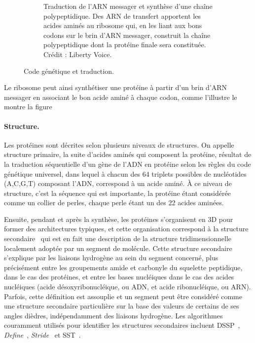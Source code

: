 \begin{figure}[htb]
\begin{subfigure}[t]{0.55\textwidth}
			\caption[Traduction de l'ARN messager en protéine]{Traduction de l'ARN messager et synthèse d'une chaîne polypeptidique. Des ARN de transfert apportent les acides aminés au ribosome qui, en les liant aux bons codons sur le brin d'ARN messager, construit la chaîne polypeptidique dont la protéine finale sera constituée. Crédit : Liberty Voice\footnotemark{}.}
			\label{fig:translation}
		\end{subfigure}
		\label{fig:codeTrans}
		\caption{Code génétique et traduction.}
	\end{figure}
	
	\addtocounter{footnote}{-1}
	\addtocounter{footnote}{1}
	
	Le ribosome peut ainsi synthétiser une protéine à partir d'un brin d'ARN messager en associant le bon acide aminé à chaque codon, comme l'illustre le montre la figure
	
	\paragraph{Structure.}
	Les protéines sont décrites selon plusieurs niveaux de structures. On appelle structure primaire, la suite d'acides aminés qui composent la protéine, résultat de la traduction séquentielle d'un gène de l'ADN en protéine selon les règles du code génétique universel, dans lequel à chacun des 64 triplets possibles de nucléotides (A,C,G,T) composant l'ADN, correspond à un acide aminé. À ce niveau de structure, c'est la séquence qui est importante, la protéine étant considérée comme un collier de perles, chaque perle étant un des 22 acides aminées.
	
	Ensuite, pendant et après la synthèse, les protéines s'organisent en 3D pour former des architectures typiques, et cette organisation correspond à la structure secondaire~\cite{foltmann1981protein} qui est en fait une description de la structure tridimensionnelle localement adoptée par un segment de molécule. Cette structure secondaire s'explique par les liaisons hydrogène au sein du segment concerné, plus précisément entre les groupements amide et carbonyle du squelette peptidique, dans le cas des protéines, et entre les bases nucléiques dans le cas des acides nucléiques (acide désoxyribonucléique, ou ADN, et acide ribonucléique, ou ARN). Parfois, cette définition est assouplie et un segment peut être considéré comme une structure secondaire particulière sur la base des valeurs de certains de ses angles dièdres, indépendamment des liaisons hydrogène. Les algorithmes couramment utilisés pour identifier les structures secondaires incluent DSSP~\cite{kabsch1983dictionary}, \emph{Define}~\cite{richards1988identification}, \emph{Stride}~\cite{frishman1995knowledge} et SST~\cite{konagurthu2012minimum}.
		
